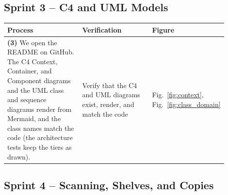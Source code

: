 \documentclass[12pt]{article}
\begin{document}
\subsection{Sprint 3 -- C4 and UML Models}

\begin{longtable}{L{0.4\linewidth} L{0.36\linewidth} L{0.14\linewidth}}
\toprule
\textbf{Process} & \textbf{Verification} & \textbf{Figure} \\
\midrule
\endhead
\textbf{(3)} We open the README on GitHub. The C4 Context, Container, and Component diagrams and the UML class and sequence diagrams render from Mermaid, and the class names match the code (the architecture tests keep the tiers as drawn). & Verify that the C4 and UML diagrams exist, render, and match the code & Fig.~\ref{fig:context}, Fig.~\ref{fig:class_domain} \\
\bottomrule
\end{longtable}

\subsection{Sprint 4 -- Scanning, Shelves, and Copies}
\end{document}

